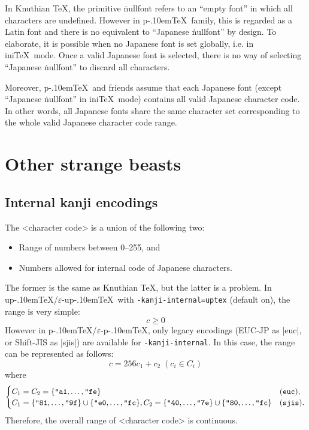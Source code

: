 \documentclass[a4paper,11pt,dvipdfmx]{article}
\let\emph=\origemph
\def\code#1{\texttt{#1}}
\def\eTeXpre{$\varepsilon$-}
\def\epTeX{\leavevmode\hbox{\eTeXpre\pTeX}}
\def\eupTeX{\leavevmode\hbox{\eTeXpre\upTeX}}
\def\pTeX{p\kern-.10em\TeX}\def\upTeX{u\pTeX}
\begin{document}
In Knuthian \TeX, the primitive \.{nullfont} refers to an ``empty font''
in which all characters are undefined.
However in \pTeX\ family, this is regarded as a Latin font
and there is no equivalent to ``Japanese \.{nullfont}'' by design.
To elaborate, it is possible \emph{only} when no Japanese font is
set globally, i.e. in ini\TeX\ mode.
Once a valid Japanese font is selected, there is no way of
selecting ``Japanese \.{nullfont}'' to discard all characters.

Moreover, \pTeX\ and friends assume that each Japanese font
(except ``Japanese \.{nullfont}'' in ini\TeX\ mode)
contains all valid Japanese character code.
In other words, all Japanese fonts share the same character set
corresponding to the whole valid Japanese character code range.\label{jfont}

\section{Other strange beasts}


\subsection{Internal kanji encodings}\label{kanji-internal}

The <character code> is a union of the following two:
\begin{itemize}
 \item Range of numbers between 0--255, and
 \item Numbers allowed for internal code of Japanese characters.
\end{itemize}
The former is the same as Knuthian \TeX, but the latter is a problem.
In \upTeX/\eupTeX\ with \code{-kanji-internal=uptex} (default on),
the range is very simple:
\[ c \ge 0 \]
However in \pTeX/\epTeX, only legacy encodings (EUC-JP as |euc|,
or Shift-JIS as |sjis|) are available for \code{-kanji-internal}.
In this case, the range can be represented as follows:
\[
  c = 256c_1+c_2 \; (c_i\in C_i)
\]
where
\[
  \begin{cases}
    C_1=C_2=\{\hex{a1},\dots,\hex{fe}\} & (\mathtt{euc}), \\
    C_1=\{\hex{81},\dots,\hex{9f}\}\cup\{\hex{e0},\dots,\hex{fc}\},
    C_2=\{\hex{40},\dots,\hex{7e}\}\cup\{\hex{80},\dots,\hex{fc}\} & (\mathtt{sjis}).
  \end{cases}
\]
Therefore, the overall range of <character code> is \emph{not} continuous.
\end{document}
